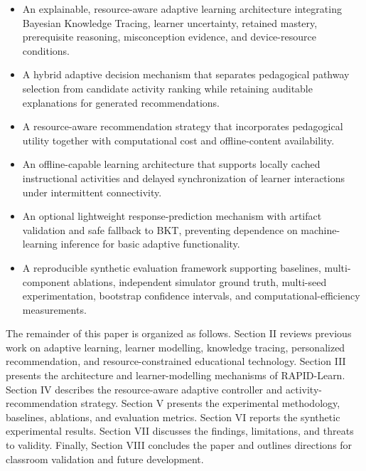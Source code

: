 \documentclass[conference]{IEEEtran}
\begin{document}
\begin{itemize}

    \item An explainable, resource-aware adaptive learning architecture integrating Bayesian Knowledge Tracing, learner uncertainty, retained mastery, prerequisite reasoning, misconception evidence, and device-resource conditions.

    \item A hybrid adaptive decision mechanism that separates pedagogical pathway selection from candidate activity ranking while retaining auditable explanations for generated recommendations.

    \item A resource-aware recommendation strategy that incorporates pedagogical utility together with computational cost and offline-content availability.

    \item An offline-capable learning architecture that supports locally cached instructional activities and delayed synchronization of learner interactions under intermittent connectivity.

    \item An optional lightweight response-prediction mechanism with artifact validation and safe fallback to BKT, preventing dependence on machine-learning inference for basic adaptive functionality.

    \item A reproducible synthetic evaluation framework supporting baselines, multi-component ablations, independent simulator ground truth, multi-seed experimentation, bootstrap confidence intervals, and computational-efficiency measurements.

\end{itemize}

The remainder of this paper is organized as follows. Section II reviews previous work on adaptive learning, learner modelling, knowledge tracing, personalized recommendation, and resource-constrained educational technology. Section III presents the architecture and learner-modelling mechanisms of RAPID-Learn. Section IV describes the resource-aware adaptive controller and activity-recommendation strategy. Section V presents the experimental methodology, baselines, ablations, and evaluation metrics. Section VI reports the synthetic experimental results. Section VII discusses the findings, limitations, and threats to validity. Finally, Section VIII concludes the paper and outlines directions for classroom validation and future development.
\end{document}
